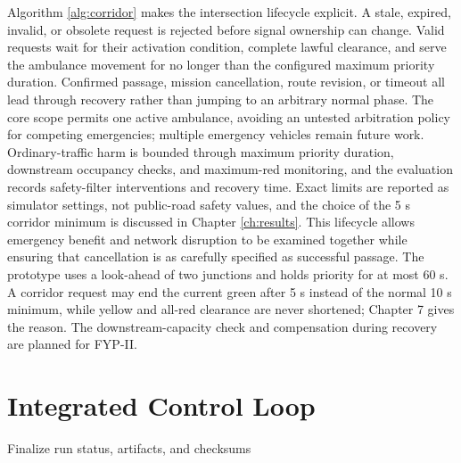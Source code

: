 Algorithm \ref{alg:corridor} makes the intersection lifecycle explicit. A stale, expired, invalid, or obsolete request is rejected before signal ownership can change. Valid requests wait for their activation condition, complete lawful clearance, and serve the ambulance movement for no longer than the configured maximum priority duration. Confirmed passage, mission cancellation, route revision, or timeout all lead through recovery rather than jumping to an arbitrary normal phase. The core scope permits one active ambulance, avoiding an untested arbitration policy for competing emergencies; multiple emergency vehicles remain future work. Ordinary-traffic harm is bounded through maximum priority duration, downstream occupancy checks, and maximum-red monitoring, and the evaluation records safety-filter interventions and recovery time. Exact limits are reported as simulator settings, not public-road safety values, and the choice of the 5 s corridor minimum is discussed in Chapter \ref{ch:results}. This lifecycle allows emergency benefit and network disruption to be examined together while ensuring that cancellation is as carefully specified as successful passage. The prototype uses a look-ahead of two junctions and holds priority for at most 60 s. A corridor request may end the current green after 5 s instead of the normal 10 s minimum, while yellow and all-red clearance are never shortened; Chapter 7 gives the reason. The downstream-capacity check and compensation during recovery are planned for FYP-II.


\section{Integrated Control Loop}

\begin{algorithm}[H]
\caption{Single-owner simulation and decision loop}
\label{alg:loop}
Finalize run status, artifacts, and checksums\;
\end{algorithm}

